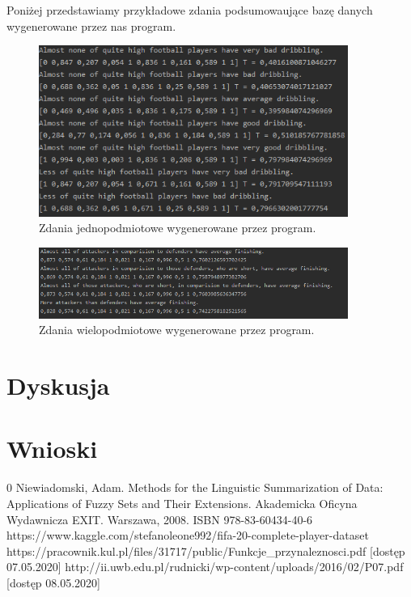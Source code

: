 \documentclass{classrep}
\begin{document}
	Poniżej przedstawiamy przykładowe zdania podsumowaujące bazę danych wygenerowane przez nas program.
	\begin{figure}[h!]
		\centering
		\includegraphics[width=0.9\textwidth]{zdania1.png}
		\caption{Zdania jednopodmiotowe wygenerowane przez program.}
		\label{zdania}
	\end{figure}

	\begin{figure}[h!]
		\centering
		\includegraphics[width=0.9\textwidth]{zdania2.png}
		\caption{Zdania wielopodmiotowe wygenerowane przez program.}
		\label{zdania}
	\end{figure}
	
	\section{Dyskusja} %
	
	\section{Wnioski}
	

	
	\begin{thebibliography} {0}
		 Niewiadomski, Adam. Methods for the Linguistic Summarization of Data: Applications of Fuzzy Sets and Their Extensions. Akademicka Oficyna Wydawnicza EXIT. Warszawa, 2008. ISBN 978-83-60434-40-6
		 https://www.kaggle.com/stefanoleone992/fifa-20-complete-player-dataset 
		 https://pracownik.kul.pl/files/31717/public/Funkcje\_przynaleznosci.pdf [dostęp 07.05.2020]
		 http://ii.uwb.edu.pl/rudnicki/wp-content/uploads/2016/02/P07.pdf [dostęp 08.05.2020]
	\end{thebibliography}
\end{document}
